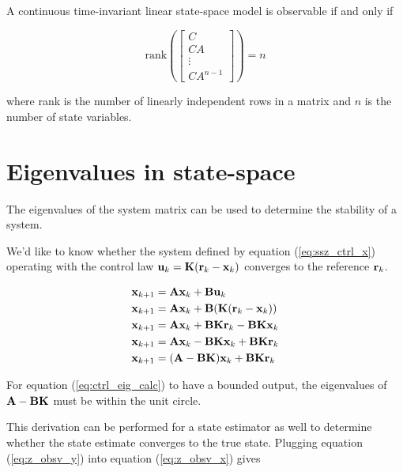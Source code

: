 \begin{theorem}[Observability]
  A continuous \gls{time-invariant} linear state-space \gls{model} is observable
  if and only if

  \begin{equation} \label{eq:obsv_rank}
    \text{rank} \left(
    \begin{bmatrix}
      C \\
      CA \\
      \vdots \\
      CA^{n-1}
    \end{bmatrix}\right) = n
  \end{equation}

  where rank is the number of linearly independent rows in a matrix and $n$ is
  the number of \gls{state} variables.
\end{theorem}

\section{Eigenvalues in state-space}

The eigenvalues of the system matrix can be used to determine the stability of a
\gls{system}.

We'd like to know whether the \gls{system} defined by equation
(\ref{eq:ssz_ctrl_x}) operating with the \gls{control law}
$\mathbf{u}_k = \mathbf{K}(\mathbf{r}_k - \mathbf{x}_k)$ converges to the \gls{reference}
$\mathbf{r}_k$.

\begin{align}
  \mathbf{x}_{k+1} &= \mathbf{A}\mathbf{x}_k + \mathbf{B}\mathbf{u}_k \nonumber \\
  \mathbf{x}_{k+1} &= \mathbf{A}\mathbf{x}_k + \mathbf{B}(\mathbf{K}(\mathbf{r}_k - \mathbf{x}_k))
    \nonumber \\
  \mathbf{x}_{k+1} &= \mathbf{A}\mathbf{x}_k + \mathbf{B}\mathbf{K}\mathbf{r}_k -
    \mathbf{B}\mathbf{K}\mathbf{x}_k \nonumber \\
  \mathbf{x}_{k+1} &= \mathbf{A}\mathbf{x}_k - \mathbf{B}\mathbf{K}\mathbf{x}_k +
    \mathbf{B}\mathbf{K}\mathbf{r}_k \nonumber \\
  \mathbf{x}_{k+1} &= (\mathbf{A} - \mathbf{B}\mathbf{K})\mathbf{x}_k +
    \mathbf{B}\mathbf{K}\mathbf{r}_k \label{eq:ctrl_eig_calc}
\end{align}

For equation (\ref{eq:ctrl_eig_calc}) to have a bounded output, the eigenvalues
of $\mathbf{A} - \mathbf{B}\mathbf{K}$ must be within the unit circle.

This derivation can be performed for a \gls{state} estimator as well to
determine whether the \gls{state} estimate converges to the true \gls{state}.
Plugging equation (\ref{eq:z_obsv_y}) into equation (\ref{eq:z_obsv_x}) gives

